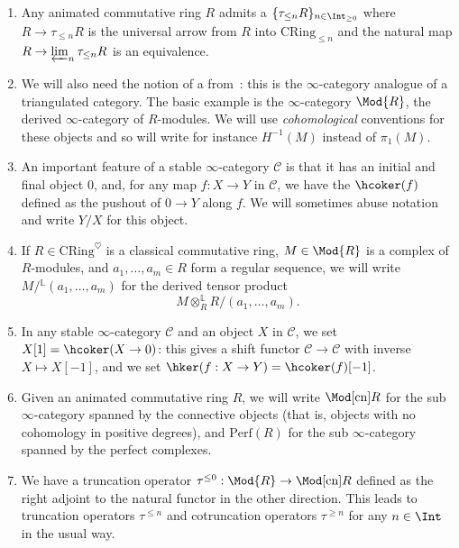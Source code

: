 \documentclass[10pt]{amsart}
\begin{document}
\begin{enumerate}
  \item Any animated commutative ring $R$ admits a  $\{\tau_{\leq n}R\}_{n\in \Int_{\ge 0}}$ where $R\to \tau_{\leq n}R$ is the universal arrow from $R$ into $\mathrm{CRing}_{\leq n}$ and the natural map $R\to \varprojlim_n \tau_{\leq n}R$ is an equivalence.

  \item We will also need the notion of a  from~\cite{Lurie2017-oh}: this is the $\infty$-category analogue of a triangulated category. The basic example is the $\infty$-category $\Mod{R}$, the derived $\infty$-category of $R$-modules. We will use \emph{cohomological} conventions for these objects and so will write for instance $H^{-1}(M)$ instead of $\pi_1(M)$.

  \item An important feature of a stable $\infty$-category $\mathcal{C}$ is that it has an initial and final object $0$, and, for any map $f:X\to Y$ in $\mathcal{C}$, we have the  $\hcoker(f)$ defined as the pushout of $0\to Y$ along $f$. We will sometimes abuse notation and write $Y/X$ for this object.

  \item If $R\in \mathrm{CRing}^{\heartsuit}$ is a classical commutative ring, $M\in \Mod{R}$ is a complex of $R$-modules, and $a_1,\ldots,a_m\in R$ form a regular sequence, we will write $M/{}^{\mathbb{L}}(a_1,\ldots,a_m)$ for the derived tensor product
  \[
    M\otimes^{\mathbb{L}}_RR/(a_1,\ldots,a_m).
  \]
  


  \item In any stable $\infty$-category $\mathcal{C}$ and an object $X$ in $\mathcal{C}$, we set $X[1]=\hcoker(X\to 0)$: this gives a shift functor $\mathcal{C}\to \mathcal{C}$ with inverse $X\mapsto X[-1]$, and we set $\hker(f:X\to Y)  = \hcoker(f)[-1]$. 

  \item Given an animated commutative ring $R$, we will write $\Mod[\mathrm{cn}]{R}$ for the sub $\infty$-category spanned by the connective objects (that is, objects  with no cohomology in positive degrees), and $\mathrm{Perf}(R)$ for the sub $\infty$-category spanned by the perfect complexes. 

  \item We have a truncation operator $\tau^{\leq 0}:\Mod{R}\to \Mod[\mathrm{cn}]{R}$ defined as the right adjoint to the natural functor in the other direction. This leads to truncation operators $\tau^{\leq n}$ and cotruncation operators $\tau^{\geq n}$ for any $n\in \Int$ in the usual way.


\end{enumerate}
\end{document}
